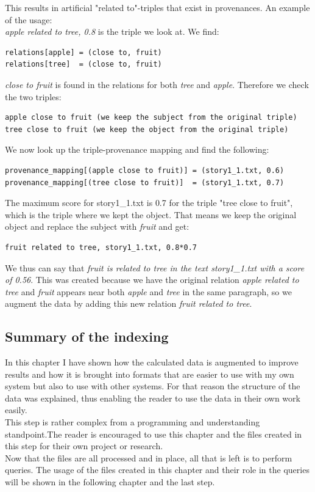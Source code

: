 This results in artificial "related  to"-triples that exist in provenances.
An example of the usage:\\
\textit{apple related to tree, 0.8} is the triple we look at.
We find:
\begin{lstlisting}
relations[apple] = (close to, fruit)
relations[tree]  = (close to, fruit)
\end{lstlisting}
\textit{close to fruit} is found in the relations for both \textit{tree} and \textit{apple}. Therefore we check the two triples:
\begin{lstlisting}
apple close to fruit (we keep the subject from the original triple)
tree close to fruit (we keep the object from the original triple)
\end{lstlisting}
We now look up the triple-provenance mapping and find the following:
\begin{lstlisting}
provenance_mapping[(apple close to fruit)] = (story1_1.txt, 0.6)
provenance_mapping[(tree close to fruit)]  = (story1_1.txt, 0.7)
\end{lstlisting}
The maximum score for story1\_1.txt is 0.7 for the triple "tree close to fruit", which is the triple where we kept the object. That means we keep the original object and replace the subject with \textit{fruit} and get:
\begin{lstlisting}
fruit related to tree, story1_1.txt, 0.8*0.7
\end{lstlisting}
We thus can say that \textit{fruit is related to tree in the text story1\_1.txt with a score of 0.56}. This was created because we have the original relation \textit{apple related to tree} and \textit{fruit} appears near both \textit{apple} and \textit{tree} in the same paragraph, so we augment the data by adding this new relation \textit{fruit related to tree}.

\subsection{Summary of the indexing}
In this chapter I have shown how the calculated data is augmented to improve results and how it is brought into formats that are easier to use with my own system but also to use with other systems. For that reason the structure of the data was explained, thus enabling the reader to use the data in their own work easily.\\
This step is rather complex from a programming and understanding standpoint.The reader is encouraged to use this chapter and the files created in this step for their own project or research.\\
Now that the files are all processed and in place, all that is left is to perform queries. The usage of the files created in this chapter and their role in the queries will be shown in the following chapter and the last step.

